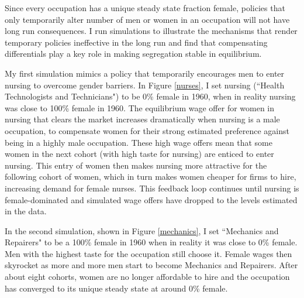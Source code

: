 \documentclass[12pt]{article}
\begin{document}
Since every occupation has a unique steady state fraction female, policies that only temporarily alter number of men or women in an occupation will not have long run consequences. I run simulations to illustrate the mechanisms that render temporary policies ineffective in the long run and find that compensating differentials play a key role in making segregation stable in equilibrium. 

My first simulation mimics a policy that temporarily encourages men to enter nursing to overcome gender barriers. In Figure \ref{nurses}, I set nursing (``Health Technologists and Technicians") to be 0\% female in 1960, when in reality nursing was close to 100\% female in 1960. The equilibrium wage offer for women in nursing that clears the market increases dramatically when nursing is a male occupation, to compensate women for their strong estimated preference against being in a highly male occupation. These high wage offers mean that some women in the next cohort (with high taste for nursing) are enticed to enter nursing. This entry of women then makes nursing more attractive for the following cohort of women, which in turn makes women cheaper for firms to hire, increasing demand for female nurses. This feedback loop continues until nursing is female-dominated and simulated wage offers have dropped to the levels estimated in the data.




In the second simulation, shown in Figure \ref{mechanics}, I set ``Mechanics and Repairers" to be a 100\% female in 1960 when in reality it was close to 0\% female. Men with the highest taste for the occupation still choose it. Female wages then skyrocket as more and more men start to become Mechanics and Repairers. After about eight cohorts, women are no longer affordable to hire and the occupation has converged to its unique steady state at around 0\% female.
\end{document}
